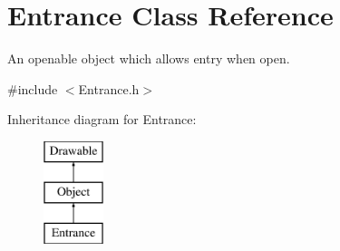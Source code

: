 \hypertarget{class_entrance}{}\section{Entrance Class Reference}
\label{class_entrance}


An openable object which allows entry when open.  




{\ttfamily \#include $<$Entrance.\+h$>$}

Inheritance diagram for Entrance\+:\begin{figure}[H]
\begin{center}
\leavevmode
\includegraphics[height=3.000000cm]{class_entrance}
\end{center}
\end{figure}
